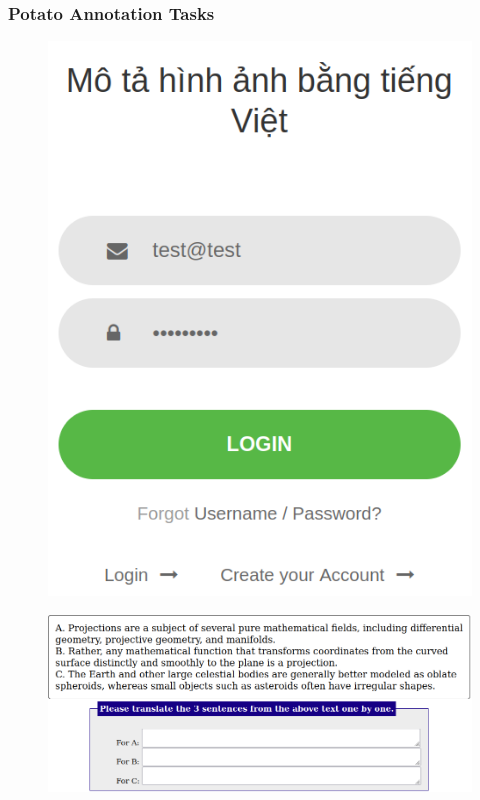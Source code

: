 \documentclass[aspectratio=169]{beamer}
\begin{document}
\begin{frame}[fragile]
	\frametitle{Potato Annotation Tasks}
    \begin{minipage}{.10\textwidth}
        \centering
        \begin{figure}
            \includegraphics[width=1.0\textwidth]{images/mtacr-potato-login.png} 
        \end{figure}
    \end{minipage}\hfill%
    \begin{minipage}{.45\textwidth}
        \centering
        \begin{figure}
            \includegraphics[width=1.0\textwidth]{images/mtacr-potato-nllb-mfe.png} 

\end{figure}
\end{minipage}
\end{frame}
\end{document}
